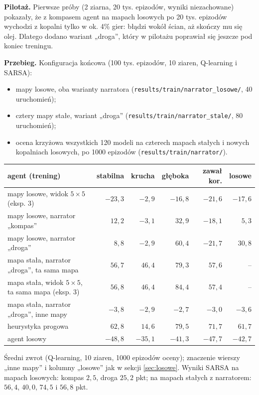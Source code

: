 \documentclass[11pt,a4paper]{article}
\begin{document}
\textbf{Pilotaż.} Pierwsze próby (2 ziarna, 20 tys. epizodów, wyniki niezachowane)
pokazały, że z kompasem agent na mapach losowych po 20 tys. epizodów wychodzi
z kopalni tylko w ok. 4\% gier: błądzi wokół ścian, aż skończy mu się olej. Dlatego
dodano wariant „droga”, który w pilotażu poprawiał się jeszcze pod koniec treningu.

\textbf{Przebieg.} Konfiguracja końcowa (100 tys. epizodów, 10 ziaren, Q-learning
i SARSA):
\begin{itemize}
  \item mapy losowe, oba warianty narratora
  (\texttt{results/\allowbreak train/\allowbreak narrator\_losowe/}, 40 uruchomień);
  \item cztery mapy stałe, wariant „droga”
  (\texttt{results/\allowbreak train/\allowbreak narrator\_stale/}, 80 uruchomień);
  \item ocena krzyżowa wszystkich 120 modeli na czterech mapach stałych i nowych
  kopalniach losowych, po 1000 epizodów
  (\texttt{results/\allowbreak train/\allowbreak narrator/}).
\end{itemize}

\begin{center}
\small
\begin{tabular}{@{}lrrrrr@{}}
\toprule
agent (trening) & stabilna & krucha & głęboka & zawał kor. & losowe \\
\midrule
mapy losowe, widok $5\times5$ (eksp. 3) & $-23{,}3$ & $-2{,}9$ & $-16{,}8$ & $-21{,}6$ & $-17{,}6$ \\
mapy losowe, narrator „kompas” & $12{,}2$ & $-3{,}1$ & $32{,}9$ & $-18{,}1$ & $5{,}3$ \\
mapy losowe, narrator „droga” & $8{,}8$ & $-2{,}9$ & $60{,}4$ & $-21{,}7$ & $30{,}8$ \\
\midrule
mapa stała, narrator „droga”, ta sama mapa & $56{,}7$ & $46{,}4$ & $79{,}3$ & $57{,}6$ & -- \\
mapa stała, widok $5\times5$, ta sama mapa (eksp. 3) & $56{,}8$ & $46{,}4$ & $84{,}4$ & $57{,}4$ & -- \\
mapa stała, narrator „droga”, inne mapy & $-3{,}8$ & $-2{,}9$ & $-2{,}7$ & $-3{,}0$ & $-3{,}6$ \\
\midrule
heurystyka progowa & $62{,}8$ & $14{,}6$ & $79{,}5$ & $71{,}7$ & $61{,}7$ \\
agent losowy & $-48{,}8$ & $-35{,}1$ & $-41{,}3$ & $-47{,}7$ & $-42{,}7$ \\
\bottomrule
\end{tabular}
\end{center}
Średni zwrot (Q-learning, 10 ziaren, 1000 epizodów oceny); znaczenie wierszy
„inne mapy” i kolumny „losowe” jak w sekcji \ref{sec:losowe}. Wyniki SARSA na mapach
losowych: kompas $2{,}5$, droga $25{,}2$ pkt; na mapach stałych z narratorem:
$56{,}4$, $40{,}0$, $74{,}5$ i $56{,}8$ pkt.
\end{document}
